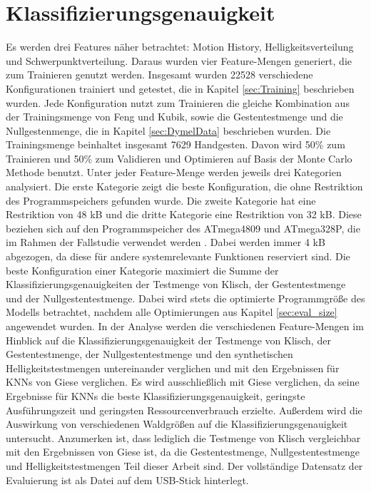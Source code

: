 \section{Klassifizierungsgenauigkeit}
Es werden drei Features näher betrachtet: Motion History, Helligkeitsverteilung und Schwerpunktverteilung. Daraus wurden vier Feature-Mengen generiert, die zum Trainieren genutzt werden. Insgesamt wurden 22528
verschiedene Konfigurationen trainiert und getestet, die in Kapitel \ref{sec:Training} beschrieben wurden. Jede Konfiguration nutzt zum Trainieren die gleiche Kombination aus der Trainingsmenge von Feng und Kubik,
sowie die Gestentestmenge und die Nullgestenmenge, die in Kapitel \ref{sec:DymelData} beschrieben wurden. Die Trainingsmenge beinhaltet insgesamt 7629 Handgesten. Davon wird 50\% zum Trainieren und 50\% zum
Validieren und Optimieren auf Basis der Monte Carlo Methode benutzt.
\newline
\newline
Unter jeder Feature-Menge werden jeweils drei Kategorien analysiert. Die erste Kategorie zeigt die beste Konfiguration, die ohne Restriktion des Programmspeichers gefunden wurde. Die zweite Kategorie hat eine Restriktion
von 48 kB und die dritte Kategorie eine Restriktion von 32 kB. Diese beziehen sich auf den Programmspeicher des ATmega4809 und ATmega328P, die im Rahmen der Fallstudie verwendet werden \cite{venzkeArticle}.
Dabei werden immer 4 kB abgezogen, da diese für andere systemrelevante Funktionen reserviert sind. Die beste Konfiguration einer Kategorie maximiert die Summe
der Klassifizierungsgenauigkeiten der Testmenge von Klisch, der Gestentestmenge und der Nullgestentestmenge. Dabei wird stets die optimierte Programmgröße des Modells betrachtet,
nachdem alle Optimierungen aus Kapitel \ref{sec:eval_size} angewendet wurden.
\newline
\newline
In der Analyse werden die verschiedenen Feature-Mengen im Hinblick auf die Klassifizierungsgenauigkeit der Testmenge von Klisch, der Gestentestmenge, der Nullgestentestmenge und den synthetischen
Helligkeitstestmengen untereinander verglichen und mit den Ergebnissen für KNNs von Giese verglichen. Es wird ausschließlich mit Giese verglichen, da seine Ergebnisse für KNNs die beste Klassifizierungsgenauigkeit,
geringste Ausführungszeit und geringsten Ressourcenverbrauch erzielte. Außerdem wird die Auswirkung von verschiedenen Waldgrößen auf die Klassifizierungsgenauigkeit untersucht. Anzumerken ist, dass
lediglich die Testmenge von Klisch vergleichbar mit den Ergebnissen von Giese ist, da die Gestentestmenge, Nullgestentestmenge und Helligkeitstestmengen Teil dieser Arbeit sind.
Der vollständige Datensatz der Evaluierung ist als Datei auf dem USB-Stick hinterlegt.







